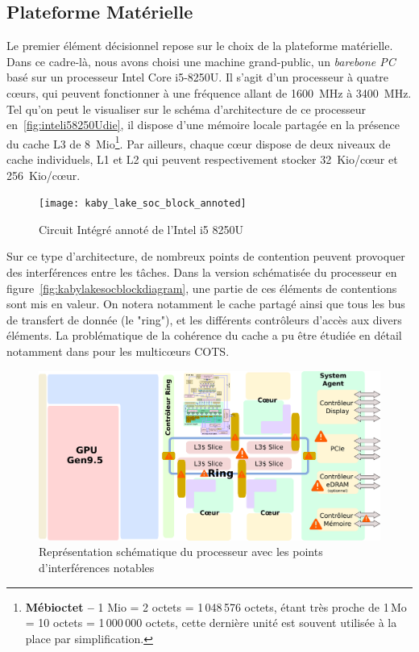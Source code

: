 \documentclass[french, a4paper, 11pt, twoside, pdftex]{StyleThese}
\begin{document}
        \subsection{Plateforme Matérielle}
        	Le premier élément décisionnel repose sur le choix de la plateforme matérielle. Dans ce cadre-là, nous avons choisi une machine grand-public, un \textit{barebone PC} basé sur un processeur Intel Core i5-8250U. Il s'agit d'un processeur à quatre cœurs, qui peuvent fonctionner à une fréquence allant de 1600~MHz à 3400~MHz. Tel qu'on peut le visualiser sur le schéma d'architecture de ce processeur en~\autoref{fig:inteli58250Udie}, il dispose d'une mémoire locale partagée en la présence du cache L3 de 8~Mio\footnote{\textbf{Mébioctet -- }1 Mio = 2 octets = 1\,048\,576 octets, étant très proche de 1\,Mo = 10 octets = 1\,000\,000 octets, cette dernière unité est souvent utilisée à la place par simplification.}. Par ailleurs, chaque cœur dispose de deux niveaux de cache individuels, L1 et L2 qui peuvent respectivement stocker 32~Kio/cœur et 256~Kio/cœur. 
       	\begin{figure}[ht]
       		\centering
       		\texttt{[image: kaby\_lake\_soc\_block\_annoted]} %
       		\caption{Circuit Intégré annoté de l'Intel i5 8250U}
       		\label{fig:inteli58250Udie}
       	\end{figure}
       
        	Sur ce type d'architecture, de nombreux points de contention peuvent provoquer des interférences entre les tâches. Dans la version schématisée du processeur en figure~\autoref{fig:kabylakesocblockdiagram}, une partie de ces éléments de contentions sont mis en valeur. On notera notamment le cache partagé ainsi que tous les bus de transfert de donnée (le "ring"), et les différents contrôleurs d'accès aux divers éléments. La problématique de la cohérence du cache a pu être étudiée en détail notamment dans %
        	 pour les multicœurs COTS.
        	
		\begin{figure}[ht]
			\centering
			\includegraphics[width=\linewidth]{schemas/kaby_lake_soc_block_diagram}
			\captionsetup{justification=centering}
			\caption{Représentation schématique du processeur avec les points d'interférences notables}
			\label{fig:kabylakesocblockdiagram}
		\end{figure}
	
\end{document}
